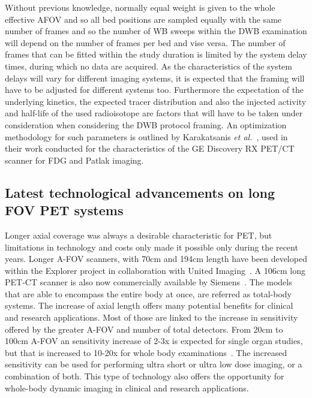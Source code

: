 Without previous knowledge, normally equal weight is given to the whole effective AFOV and so all bed positions are sampled equally with the same number of frames and so the number of WB sweeps within the DWB examination will depend on the number of frames per bed and vise versa. The number of frames that can be fitted within the study duration is limited by the system delay times, during which no data are acquired. As the characteristics of the system delays will vary for different imaging systems, it is expected that the framing will have to be adjusted for different systems too. Furthermore the expectation of the underlying kinetics, the expected tracer distribution and also the injected activity and half-life of the used radioisotope are factors that will have to be taken under consideration when considering the DWB protocol framing. 
An optimization methodology for such parameters is outlined by Karakatsanis \textit{et al.}~\cite{Karakatsanis2013}, used in their work conducted for the characteristics of the GE Discovery RX PET/CT scanner for FDG and Patlak imaging. 



\subsection{Latest technological advancements on long FOV PET systems}
Longer axial coverage was always a desirable characteristic for PET, but limitations in technology and costs only made it possible only during the recent years. Longer A-FOV scanners, with 70cm and 194cm length have been developed within the Explorer project in collaboration with United Imaging~\cite{Cherry2017,Badawi2019}. A 106cm long PET-CT scanner is also now commercially available by Siemens~\cite{Siegel2020}.  The models that are able to encompass the entire body at once, are referred as total-body systems. 
The increase of axial length offers many potential benefits for clinical and research applications. Most of those are linked to the increase in sensitivity offered by the greater A-FOV and number of total detectors. From 20cm to 100cm A-FOV an sensitivity increase of 2-3x is expected for single organ studies, but that is increased to 10-20x for whole body examinations~\cite{Vandenberghe2020}. The increased sensitivity can be used for performing ultra short or ultra low dose imaging, or a combination of both. This type of technology also offers the opportunity for whole-body dynamic imaging in clinical and research applications. 
